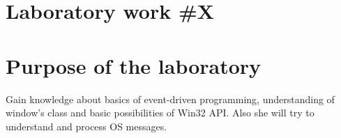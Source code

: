 \documentclass[12pt,a4paper,titlepage]{article}
\begin{document}
\begin{titlepage}
\begin{center}
      \vspace{5 mm}






      \vfill %
      \end{center}
      
\end{titlepage}

\cleardoublepage

\newpage

\setcounter{page}{1}
\setcounter{secnumdepth}{4}

\cleardoublepage


{}
\section*{Laboratory work \#X}

\section{Purpose of the laboratory}
Gain knowledge about basics of event-driven programming, understanding of window’s class and basic possibilities of Win32 API. Also she will try to understand and process OS messages.
\end{document}
